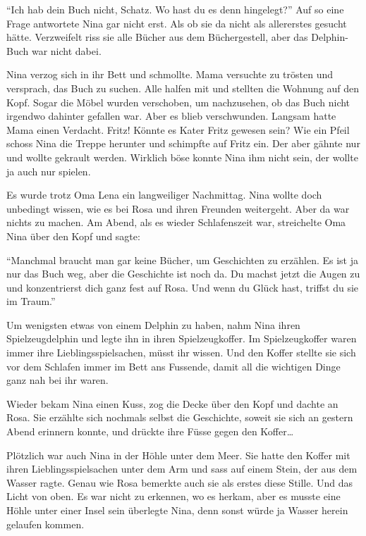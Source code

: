 \begin{mdframed}[style=mystyle]
\enquote{Ich hab dein Buch nicht, Schatz. Wo hast du es denn hingelegt?} Auf so eine Frage antwortete Nina gar nicht erst. Als ob sie da nicht als allererstes gesucht hätte. Verzweifelt riss sie alle Bücher aus dem Büchergestell, aber das Delphin-Buch war nicht dabei.

Nina verzog sich in ihr Bett und schmollte. Mama versuchte zu trösten und versprach, das Buch zu suchen. Alle halfen mit und stellten die Wohnung auf den Kopf. Sogar die Möbel wurden verschoben, um nachzusehen, ob das Buch nicht irgendwo dahinter gefallen war. Aber es blieb verschwunden.  Langsam hatte Mama einen Verdacht. Fritz! Könnte es Kater Fritz gewesen sein? Wie ein Pfeil schoss Nina die Treppe herunter und schimpfte auf Fritz ein. Der aber gähnte nur und wollte gekrault werden. Wirklich böse konnte Nina ihm nicht sein, der wollte ja auch nur spielen.

Es wurde trotz Oma Lena ein langweiliger Nachmittag. Nina wollte doch unbedingt wissen, wie es bei Rosa und ihren Freunden weitergeht. Aber da war nichts zu machen. Am Abend, als es wieder Schlafenszeit war, streichelte Oma Nina über den Kopf und sagte:

\enquote{Manchmal braucht man gar keine Bücher, um Geschichten zu erzählen. Es ist ja nur das Buch weg, aber die Geschichte ist noch da. Du machst jetzt die Augen zu und konzentrierst dich ganz fest auf Rosa. Und wenn du Glück hast, triffst du sie im Traum.}

Um wenigsten etwas von einem Delphin zu haben, nahm Nina ihren Spielzeugdelphin und legte ihn in ihren Spielzeugkoffer. Im Spielzeugkoffer waren immer ihre Lieblingsspielsachen, müsst ihr wissen. Und den Koffer stellte sie sich vor dem Schlafen immer im Bett ans Fussende, damit all die wichtigen Dinge ganz nah bei ihr waren.

Wieder bekam Nina einen Kuss, zog die Decke über den Kopf und dachte an Rosa. Sie erzählte sich nochmals selbst die Geschichte, soweit sie sich an gestern Abend erinnern konnte, und drückte ihre Füsse gegen den Koffer\dots
\end{mdframed}\medskip

Plötzlich war auch Nina in der Höhle unter dem Meer. Sie hatte den Koffer mit ihren Lieblingsspielsachen unter dem Arm und sass auf einem Stein, der aus dem Wasser ragte. Genau wie Rosa bemerkte auch sie als erstes diese Stille. Und das Licht von oben. Es war nicht zu erkennen, wo es herkam, aber es musste eine Höhle unter einer Insel sein überlegte Nina, denn sonst würde ja Wasser herein gelaufen kommen.

